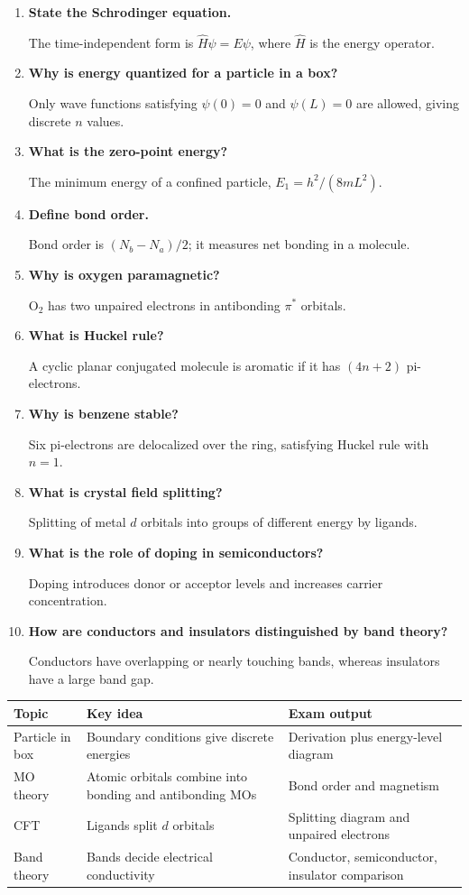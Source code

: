 \documentclass[12pt,a4paper]{article}
\newcommand{\Q}[1]{\textbf{#1}\par\noindent\ignorespaces}
\begin{document}
\begin{tcolorbox}[exambox, title={Frequently Asked / Viva Questions}]
\begin{enumerate}[topsep=0pt, label=\textbf{Q\arabic*.}, itemsep=5pt]
  \item \Q{State the Schrodinger equation.}
    The time-independent form is $\hat{H}\psi=E\psi$, where $\hat{H}$ is the energy operator.
  \item \Q{Why is energy quantized for a particle in a box?}
    Only wave functions satisfying $\psi(0)=0$ and $\psi(L)=0$ are allowed, giving discrete $n$ values.
  \item \Q{What is the zero-point energy?}
    The minimum energy of a confined particle, $E_1=h^2/(8mL^2)$.
  \item \Q{Define bond order.}
    Bond order is $(N_b-N_a)/2$; it measures net bonding in a molecule.
  \item \Q{Why is oxygen paramagnetic?}
    $\mathrm{O_2}$ has two unpaired electrons in antibonding $\pi^*$ orbitals.
  \item \Q{What is Huckel rule?}
    A cyclic planar conjugated molecule is aromatic if it has $(4n+2)$ pi-electrons.
  \item \Q{Why is benzene stable?}
    Six pi-electrons are delocalized over the ring, satisfying Huckel rule with $n=1$.
  \item \Q{What is crystal field splitting?}
    Splitting of metal $d$ orbitals into groups of different energy by ligands.
  \item \Q{What is the role of doping in semiconductors?}
    Doping introduces donor or acceptor levels and increases carrier concentration.
  \item \Q{How are conductors and insulators distinguished by band theory?}
    Conductors have overlapping or nearly touching bands, whereas insulators have a large band gap.
\end{enumerate}
\end{tcolorbox}

\begin{tcolorbox}[tikzbox, title={Summary Reference Table}]
\begin{tabularx}{\linewidth}{|B{3.2cm}|Y|Y|}
\hline
\textbf{Topic} & \textbf{Key idea} & \textbf{Exam output} \\
\hline
Particle in box & Boundary conditions give discrete energies & Derivation plus energy-level diagram \\
\hline
MO theory & Atomic orbitals combine into bonding and antibonding MOs & Bond order and magnetism \\
\hline
CFT & Ligands split $d$ orbitals & Splitting diagram and unpaired electrons \\
\hline
Band theory & Bands decide electrical conductivity & Conductor, semiconductor, insulator comparison \\
\hline
\end{tabularx}
\end{tcolorbox}
\end{document}
